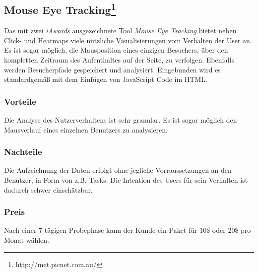 \subsection*{Mouse Eye Tracking\texttrademark \footnote{http://met.picnet.com.au/}}

Das mit zwei \textit{iAwards} ausgezeichnete Tool \textit{Mouse Eye Tracking\texttrademark} bietet neben Click- und Heatmaps viele nützliche Visualisierungen vom Verhalten der User an. Es ist sogar möglich, die Mausposition eines einzigen Besuchers, über den kompletten Zeitraum des Aufenthaltes auf der Seite, zu verfolgen. Ebenfalls werden Besucherpfade gespeichert und analysiert. Eingebunden wird es standardgemäß mit dem Einfügen von JavaScript Code im HTML.

\subsubsection*{Vorteile}
Die Analyse des Nutzerverhaltens ist sehr granular. Es ist sogar möglich den Mausverlauf eines einzelnen Benutzers zu analysieren.

\subsubsection*{Nachteile}
Die Aufzeichnung der Daten erfolgt ohne jegliche Vorraussetzungen an den Benutzer, in Form von z.B. Tasks. Die Intention des Users für sein Verhalten ist dadurch schwer einschätzbar.

\subsubsection*{Preis}
Nach einer 7-tägigen Probephase kann der Kunde ein Paket für 10\$ oder 20\$ pro Monat wählen.















